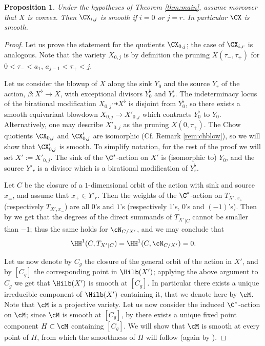 \documentclass[reqno]{amsproc}
\newtheorem{proposition}[theorem]{Proposition}
\theoremstyle{definition}
\begin{document}
\begin{proposition}\label{prop:smoothChows} Under the hypotheses of Theorem \ref{thm:main}, assume moreover that $X$ is convex. Then $\CX_{i,j}$ is smooth if $i=0$ or $j=r$. %
In particular $\CX$ is smooth.
\end{proposition}

\begin{proof}
Let us prove the statement for the quotients $\CX_{0,j}$; the case of $\CX_{i,r}$ is analogous.
Note that the variety $X_{0,j}$ is by definition the pruning $X(\tau_-,\tau_+)$ for $0 < \tau_- <a_1$, $a_{j-1} < \tau_+ < j$.  

Let us consider the blowup of $X$ along the sink $Y_0$ and the source $Y_r$ of the action, $\beta: X^\flat \to X$, with exceptional divisors $Y_0^\flat$ and $Y_r^\flat$.
The indeterminacy locus of the birational modification $X_{0,j} \dashrightarrow X^\flat$ is disjoint from $Y_0^\flat$, so there exists a smooth equivariant blowdown $X_{0,j} \to X'_{0,j}$  which contracts $Y_0^\flat$ to $Y_0$. Alternatively, one may describe $X'_{0,j}$ as the pruning $X(0,\tau_+)$.
The Chow quotients $\CX_{0,j}$ and $\CX'_{0,j}$ are isomorphic (Cf. Remark \ref{rem:chblow}),
so we will show that $\CX'_{0,j}$ is smooth. To simplify notation, for the rest of the proof we will set $X':=X'_{0,j}$.
The sink of the $\C^*$-action on $X'$ is (isomorphic to) $Y_0$, and the source $Y'_r$ is a divisor  which is a birational modification of $Y_r^\flat$.

Let $C$ be the closure of a $1$-dimensional orbit of the action with sink and source $x_\pm$, and assume that $x_+\in Y'_r$. Then the weights of the $\C^*$-action on $T_{X',x_+}$ (respectively $T_{X',x_-}$) are all $0$'s and $1$'s (respectively $1$'s, $0$'s and $(-1)$'s). Then by \cite[Lemma 2.16]{WORS1} we get that the degrees of the direct summands of ${T_{X'}}_{|C}$ cannot be smaller than $-1$; thus the same holds for $\cN_{C/X'}$, and we may conclude that 
\begin{equation}\label{eq:vanish}
\HH^1(C,{T_{X'}}_{|C})=\HH^1(C,\cN_{C/X'})=0.
\end{equation}


Let us now denote by $C_g$ the closure of the general orbit of the action in $X'$, and by $[C_g]$ the corresponding point in $\Hilb(X')$; applying the above argument to $C_g$ we get that $\Hilb(X')$ is smooth at $[C_{g}]$. In particular there exists a unique irreducible component  of $\Hilb(X')$ containing it, that we denote here by $\cM$. Note that $\cM$ is a projective variety.
Let us now consider the induced $\C^*$-action on $\cM$; since $\cM$ is smooth at $[C_g]$, by \cite[Theorem 2.5]{BB} there exists a unique fixed point component  $H \subset \cM$ containing $[C_g]$. We will show that $\cM$ is smooth at every point of $H$, from which the smoothness of $H$ will follow (again by \cite[Theorem 2.5]{BB}). 


\end{proof}
\end{document}
